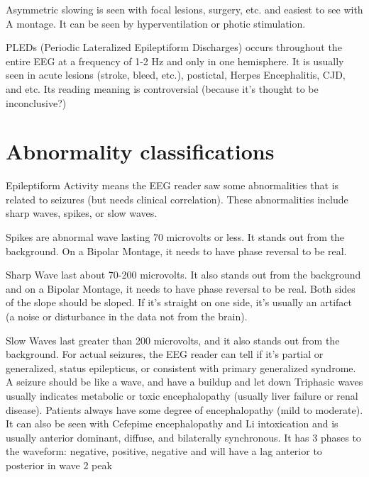 \documentclass[12pt]{article}
\begin{document}
Asymmetric slowing is seen with focal lesions, surgery, etc. and easiest to see with A montage. It can be seen by hyperventilation or photic stimulation.
 
PLEDs (Periodic Lateralized Epileptiform Discharges) occurs throughout the entire EEG at a frequency of 1-2 Hz and only in one hemisphere. It is usually seen in acute lesions (stroke, bleed, etc.), postictal, Herpes Encephalitis, CJD, and etc. Its reading meaning is controversial (because it's thought to be inconclusive?)

\section{Abnormality classifications}

Epileptiform Activity means the EEG reader saw some abnormalities that is related to seizures (but needs clinical correlation). These abnormalities include sharp waves, spikes, or slow waves. 

Spikes are abnormal wave lasting 70 microvolts or less. It stands out from the background. On a Bipolar Montage, it needs to have phase reversal to be real. 

Sharp Wave last about 70-200 microvolts. It also stands out from the background and on a Bipolar Montage, it needs to have phase reversal to be real. Both sides of the slope should be sloped. If it’s straight on one side, it’s usually an artifact (a noise or disturbance in the data not from the brain). 

Slow Waves last greater than 200 microvolts, and it also stands out from the background.
\medskip
	For actual seizures, the EEG reader can tell if it’s partial or generalized, status epilepticus, or consistent with primary generalized syndrome. A seizure should be like a wave, and have a buildup and let down
\medskip
	Triphasic waves usually indicates metabolic or toxic encephalopathy (usually liver failure or renal disease). Patients always have some degree of encephalopathy (mild to moderate). It can also be seen with Cefepime encephalopathy and Li intoxication and is usually anterior dominant, diffuse, and bilaterally synchronous. It has 3 phases to the waveform: negative, positive, negative and will have a lag anterior to posterior in wave 2 peak
\end{document}
